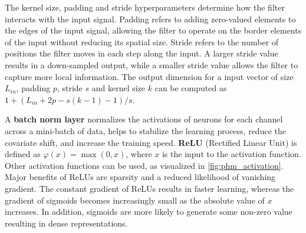 The kernel size, padding and stride hyperparameters determine how the filter interacts with the input signal. Padding refers to adding zero-valued elements to the edges of the input signal, allowing the filter to operate on the border elements of the input without reducing its spatial size. Stride refers to the number of positions the filter moves in each step along the input. A larger stride value results in a down-sampled output, while a smaller stride value allows the filter to capture more local information.
The output dimension for a input vector of size $L_{in}$, padding $p$, stride $s$ and kernel size $k$ can be computed as $1+(L_{in}+2p-s(k-1)-1)/s$.


A \textbf{batch norm layer} normalizes the activations of neurons for each channel across a mini-batch of data, helps to stabilize the learning process, reduce the covariate shift, and increase the training speed. 
\textbf{ReLU} (Rectified Linear Unit) is defined as $\varphi(x) = \max(0, x)$, where $x$ is the input to the activation function. Other activation functions can be used, as visualized in \cref{fig:phm_activation}. Major benefits of ReLUs are sparsity and a reduced likelihood of vanishing gradient. The constant gradient of ReLUs results in faster learning, whereas the gradient of sigmoids becomes increasingly small as the absolute value of $x$ increases. In addition, sigmoids are more likely to generate some non-zero value resulting in dense representations.

